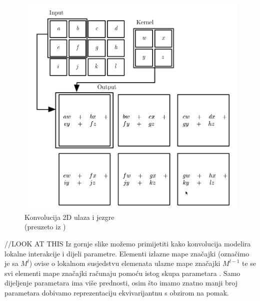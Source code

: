 \documentclass[times, utf8, diplomski]{fer}
\theoremstyle{definition}
\begin{document}
\begin{figure}[h]
\centering
\includegraphics[scale=0.47]{convolution.png}
\caption{Konvolucija 2D ulaza i jezgre \\ (preuzeto iz \cite{Goodfellow-et-al-2016})}
\label{konvolucija_i_jezgra}
\end{figure}

//LOOK AT THIS
Iz gornje slike možemo primijetiti kako konvolucija modelira lokalne interakcije i dijeli parametre. Elementi  izlazne mape značajki (označimo je sa $M^l$) ovise o lokalnom susjedstvu elemenata ulazne mape značajki $M^{l-1}$ te se svi elementi mape značajki računaju pomoću istog skupa parametara . Samo dijeljenje parametara ima više prednosti, osim što imamo znatno manji broj parametara dobivamo reprezentaciju ekvivarijantnu s obzirom na pomak.
\end{document}
